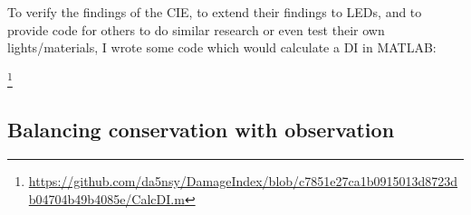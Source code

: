 To verify the findings of the CIE, to extend their findings to \glspl{LED}, and to provide code for others to do similar research or even test their own lights/materials, I wrote some code which would calculate a \gls{DI} in \gls{MATLAB}:












\footnote{\url{https://github.com/da5nsy/DamageIndex/blob/c7851e27ca1b0915013d8723db04704b49b4085e/CalcDI.m}}



\subsection{Balancing conservation with observation}
